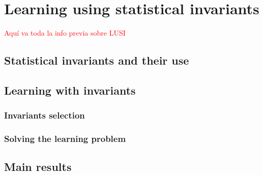 
\chapter{Learning using statistical invariants} %
\label{Chapter2}


\textcolor{red}{Aquí va toda la info previa sobre LUSI}


\label{ChapterX} %


\section{Statistical invariants and their use}

\section{Learning with invariants}

\subsection{Invariants selection}

\subsection{Solving the learning problem}

\section{Main results}
